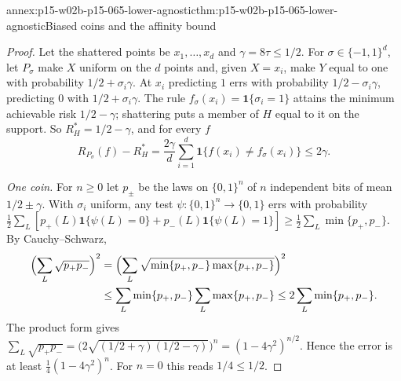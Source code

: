 \begin{annexitem}{annex:p15-w02b-p15-065-lower-agnostic}{thm:p15-w02b-p15-065-lower-agnostic}{Biased coins and the affinity bound}
\begin{proof}
Let the shattered points be \(x_1,\ldots,x_d\) and \(\gamma=8\tau\leq1/2\).
For \(\sigma\in\{-1,1\}^d\), let \(P_\sigma\) make \(X\) uniform on the
\(d\) points and, given \(X=x_i\), make \(Y\) equal to one with probability
\(1/2+\sigma_i\gamma\). At \(x_i\) predicting \(1\) errs with probability
\(1/2-\sigma_i\gamma\), predicting \(0\) with \(1/2+\sigma_i\gamma\). The
rule \(f_\sigma(x_i)=\mathbf1\{\sigma_i=1\}\) attains the minimum
achievable risk \(1/2-\gamma\); shattering puts a member of \(H\) equal to
it on the support. So \(R_H^{*}=1/2-\gamma\), and for every \(f\)
\[
 R_{P_\sigma}(f)-R_H^{*}=\frac{2\gamma}d\sum_{i=1}^d\mathbf1\{f(x_i)\ne f_\sigma(x_i)\}\leq2\gamma .
\]

\emph{One coin.} For \(n\geq0\) let \(p_\pm\) be the laws on \(\{0,1\}^n\)
of \(n\) independent bits of mean \(1/2\pm\gamma\). With \(\sigma_i\)
uniform, any test \(\psi:\{0,1\}^n\to\{0,1\}\) errs with probability
\(\frac12\sum_L[p_+(L)\mathbf1\{\psi(L)=0\}+p_-(L)\mathbf1\{\psi(L)=1\}]
\geq\frac12\sum_L\min\{p_+,p_-\}\). By Cauchy--Schwarz,
\begin{align*}
 \Bigl(\sum_L\sqrt{p_+p_-}\Bigr)^2&=\Bigl(\sum_L\sqrt{\min\{p_+,p_-\}\max\{p_+,p_-\}}\Bigr)^2\\
 &\leq\sum_L\min\{p_+,p_-\}\sum_L\max\{p_+,p_-\}\leq2\sum_L\min\{p_+,p_-\}.
\end{align*}
The product form gives
\(\sum_L\sqrt{p_+p_-}=\bigl(2\sqrt{(1/2+\gamma)(1/2-\gamma)}\bigr)^n
=(1-4\gamma^2)^{n/2}\). Hence the error is at least
\(\frac14(1-4\gamma^2)^n\). For \(n=0\) this reads \(1/4\leq1/2\).


\end{proof}
\end{annexitem}
